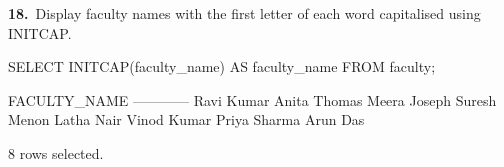 \noindent\begin{minipage}{\linewidth}
\begingroup{}
{\fontsize{14}{17}\selectfont\textbf{18.}}\ Display faculty names with the first letter of each word capitalised using INITCAP.\par
\endgroup\vspace{12pt}


\begin{sqlcode}
SELECT INITCAP(faculty_name) AS faculty_name FROM faculty;
\end{sqlcode}

\vspace{18pt}


\begin{sqlout}[fontsize=\small]
FACULTY_NAME
------------
Ravi Kumar
Anita Thomas
Meera Joseph
Suresh Menon
Latha Nair
Vinod Kumar
Priya Sharma
Arun Das

8 rows selected.
\end{sqlout}
\end{minipage}\par\vspace{24pt}

